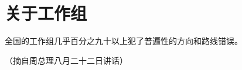 \section[关于工作组（一九六六年八月）]{关于工作组}


全国的工作组几乎百分之九十以上犯了普遍性的方向和路线错误。

{\raggedleft （摘自周总理八月二十二日讲话）\par}


